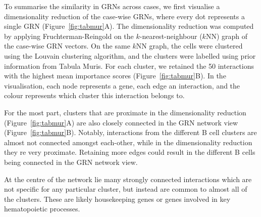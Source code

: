 To summarise the similarity in GRNs across cases, we first visualise a dimensionality reduction of the case-wise GRNs, where every dot represents a single GRN (Figure~\ref{fig:tabmur}A). The dimensionality reduction was computed by applying Fruchterman-Reingold\cite{fruchterman_graphdrawingforcedirected_1991} on the $k$-nearest-neighbour ($k$NN) graph of the case-wise GRN vectors. On the same $k$NN graph, the cells were clustered using the Louvain\cite{blondel_fastunfoldingcommunities_2008} clustering algorithm, and the clusters were labelled using prior information from Tabula Muris.
For each cluster, we retained the 50 interactions with the highest mean importance scores (Figure~\ref{fig:tabmur}B). In the visualisation, each node represents a gene, each edge an interaction, and the colour represents which cluster this interaction belongs to.

For the most part, clusters that are proximate in the dimensionality reduction (Figure~\ref{fig:tabmur}A) are also closely connected in the GRN network view (Figure~\ref{fig:tabmur}B). Notably, interactions from the different B cell clusters are almost not connected amongst each-other, while in the dimensionality reduction they re very proximate. Retaining more edges could result in the different B cells being connected in the GRN network view.

At the centre of the network lie many strongly connected interactions which are not specific for any particular cluster, but instead are common to almost all of the clusters. These are likely housekeeping genes or genes involved in key hematopoietic processes. 


